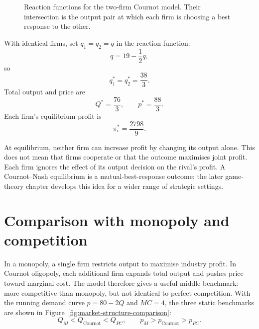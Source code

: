\begin{figure}[htbp]
  \centering
  \caption{Reaction functions for the two-firm Cournot model. Their
  intersection is the output pair at which each firm is choosing a best
  response to the other.}
  \label{fig:cournot-reaction-functions}
\end{figure}
\FloatBarrier

With identical firms, set $q_1=q_2=q$ in the reaction function:
\[
q=19-\frac{1}{2}q,
\]
so
\[
q_1^*=q_2^*=\frac{38}{3}.
\]
Total output and price are
\[
Q^*=\frac{76}{3},
\qquad
p^*=\frac{88}{3}.
\]
Each firm's equilibrium profit is
\[
\pi_i^*=\frac{2798}{9}.
\]

At equilibrium, neither firm can increase profit by changing its output alone.
This does not mean that firms cooperate or that the outcome maximises joint
profit. Each firm ignores the effect of its output decision on the rival's
profit. A Cournot--Nash equilibrium is a mutual-best-response outcome; the
later game-theory chapter develops this idea for a wider range of strategic
settings.

\section{Comparison with monopoly and competition}

In a monopoly, a single firm restricts output to maximise industry profit. In
Cournot oligopoly, each additional firm expands total output and pushes price
toward marginal cost. The model therefore gives a useful middle benchmark:
more competitive than monopoly, but not identical to perfect competition.
With the running demand curve $p=80-2Q$ and $MC=4$, the three static
benchmarks are shown in Figure~\ref{fig:market-structure-comparison}:
\[
Q_M<Q_{\text{Cournot}}<Q_{PC},
\qquad
p_M>p_{\text{Cournot}}>p_{PC}.
\]

